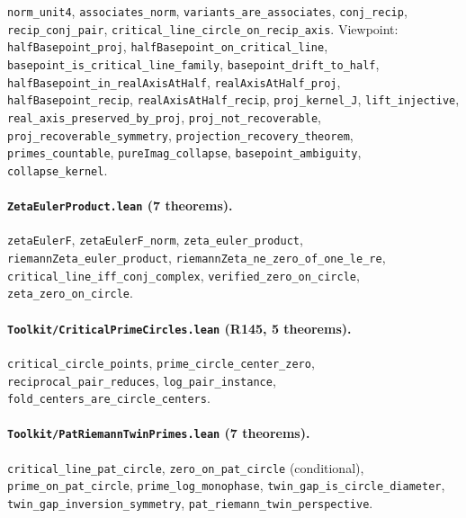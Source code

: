 \documentclass[sigplan,10pt,anonymous,review]{acmart}
\begin{document}
\texttt{norm\_unit4}, \texttt{associates\_norm},
\texttt{variants\_are\_associates}, \texttt{conj\_recip},
\texttt{recip\_conj\_pair}, \texttt{critical\_line\_circle\_on\_recip\_axis}.
Viewpoint: \texttt{halfBasepoint\_proj},
\texttt{halfBasepoint\_on\_critical\_line},
\texttt{basepoint\_is\_critical\_line\_family},
\texttt{basepoint\_drift\_to\_half},
\texttt{halfBasepoint\_in\_realAxisAtHalf},
\texttt{realAxisAtHalf\_proj}, \texttt{halfBasepoint\_recip},
\texttt{realAxisAtHalf\_recip}, \texttt{proj\_kernel\_J},
\texttt{lift\_injective}, \texttt{real\_axis\_preserved\_by\_proj},
\texttt{proj\_not\_recoverable}, \texttt{proj\_recoverable\_symmetry},
\texttt{projection\_recovery\_theorem}, \texttt{primes\_countable},
\texttt{pureImag\_collapse}, \texttt{basepoint\_ambiguity},
\texttt{collapse\_kernel}.

\paragraph{\texttt{ZetaEulerProduct.lean} (7 theorems).}
\texttt{zetaEulerF}, \texttt{zetaEulerF\_norm},
\texttt{zeta\_euler\_product}, \texttt{riemannZeta\_euler\_product},
\texttt{riemannZeta\_ne\_zero\_of\_one\_le\_re},
\texttt{critical\_line\_iff\_conj\_complex}, \texttt{verified\_zero\_on\_circle},
\texttt{zeta\_zero\_on\_circle}.

\paragraph{\texttt{Toolkit/CriticalPrimeCircles.lean} (R145, 5 theorems).}
\texttt{critical\_circle\_points}, \texttt{prime\_circle\_center\_zero},
\texttt{reciprocal\_pair\_reduces}, \texttt{log\_pair\_instance},
\texttt{fold\_centers\_are\_circle\_centers}.

\paragraph{\texttt{Toolkit/PatRiemannTwinPrimes.lean} (7 theorems).}
\texttt{critical\_line\_pat\_circle}, \texttt{zero\_on\_pat\_circle}
(conditional), \texttt{prime\_on\_pat\_circle},
\texttt{prime\_log\_monophase}, \texttt{twin\_gap\_is\_circle\_diameter},
\texttt{twin\_gap\_inversion\_symmetry},
\texttt{pat\_riemann\_twin\_perspective}.



\end{document}
